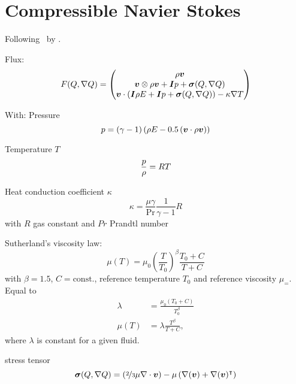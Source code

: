 \section{Compressible Navier Stokes}
Following~\cite{dumbser2010arbitrary} by \citeauthor{dumbser2010arbitrary}.

Flux:
\begin{equation}
  F(Q, \nabla Q) = 
  \begin{pmatrix}
    \rho \bm{v} \\
    \bm{v}  \otimes \rho \bm{v} + \bm{I} p + \bm{\sigma} (Q, \nabla Q)  \\
    \bm{v} \cdot (\bm{I} \rho E + \bm{I} p + \bm{\sigma} (Q, \nabla Q)) - \kappa \nabla T
  \end{pmatrix}
\end{equation}

With:
Pressure \pressure
\begin{equation}
  p = (\gamma - 1) \left(\rho E - 0.5 \left(\bm{v} \cdot \rho \bm{v} \right) \right)
\end{equation}

Temperature $T$
\begin{equation}
  \label{eq:temperature}
 \frac{p}{\rho} = RT
\end{equation}

Heat conduction coefficient $\kappa$
\begin{equation}
  \label{eq:heat-conduction-coeff}
  \kappa = \frac{\mu \gamma}{\Pr} \frac{1}{\gamma - 1} R
\end{equation}
with $R$ gas constant and $Pr$ Prandtl number

Sutherland's viscosity law:
\begin{equation}
  \label{eq:sutherland}
 \mu(T)  = \mu_0 {\left(\frac{T}{T_0}  \right)}^{\beta} \frac{T_0 + C}{T + C}
\end{equation}
with \(\beta = 1.5\), \(C = \text{const.}\), reference temperature $T_0$ and reference viscosity $\mu_=$.
Equal to
\begin{align}
  \lambda &= \frac{\mu_0 (T_0 + C)}{T_0^\beta} \\
  \mu(T) &= \lambda \frac{T^\beta}{T + C},
\end{align}
where $\lambda$ is constant for a given fluid.

stress tensor
\begin{equation}
  \label{eq:stress-tensor}
  \bm{\sigma}(Q, \nabla Q) = \left(\nicefrac{2}{3} \mu \nabla \cdot \bm{v} \right) -
  \mu \left( \nabla (\bm{v}) + \nabla ( \bm{v} )^\intercal \right)
\end{equation}

